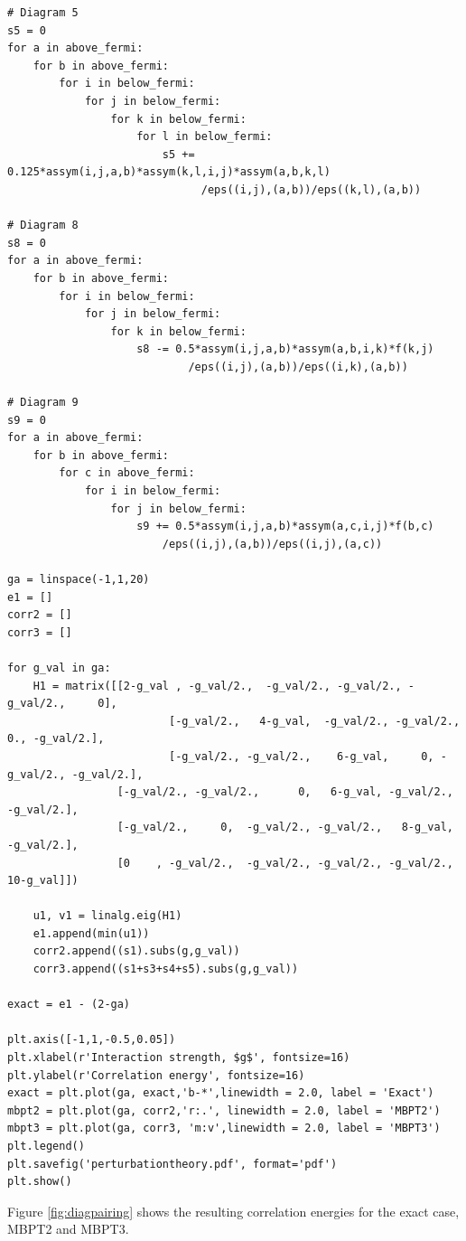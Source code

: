 \begin{lstlisting}
# Diagram 5
s5 = 0
for a in above_fermi:
    for b in above_fermi:
        for i in below_fermi:
            for j in below_fermi:
                for k in below_fermi:
                    for l in below_fermi:
                        s5 += 0.125*assym(i,j,a,b)*assym(k,l,i,j)*assym(a,b,k,l)
                              /eps((i,j),(a,b))/eps((k,l),(a,b))

# Diagram 8 
s8 = 0
for a in above_fermi:
    for b in above_fermi:
        for i in below_fermi:
            for j in below_fermi:
                for k in below_fermi:
                    s8 -= 0.5*assym(i,j,a,b)*assym(a,b,i,k)*f(k,j)
                            /eps((i,j),(a,b))/eps((i,k),(a,b))

# Diagram 9 
s9 = 0
for a in above_fermi:
    for b in above_fermi:
        for c in above_fermi:
            for i in below_fermi:
                for j in below_fermi:
                    s9 += 0.5*assym(i,j,a,b)*assym(a,c,i,j)*f(b,c)
                        /eps((i,j),(a,b))/eps((i,j),(a,c))

ga = linspace(-1,1,20)
e1 = []
corr2 = []
corr3 = []

for g_val in ga:
    H1 = matrix([[2-g_val , -g_val/2.,  -g_val/2., -g_val/2., -g_val/2.,     0],
                         [-g_val/2.,   4-g_val,  -g_val/2., -g_val/2.,    0., -g_val/2.],
                         [-g_val/2., -g_val/2.,    6-g_val,     0, -g_val/2., -g_val/2.],
                 [-g_val/2., -g_val/2.,      0,   6-g_val, -g_val/2., -g_val/2.],
                 [-g_val/2.,     0,  -g_val/2., -g_val/2.,   8-g_val, -g_val/2.],
                 [0    , -g_val/2.,  -g_val/2., -g_val/2., -g_val/2.,  10-g_val]])

    u1, v1 = linalg.eig(H1)
    e1.append(min(u1))
    corr2.append((s1).subs(g,g_val))
    corr3.append((s1+s3+s4+s5).subs(g,g_val))

exact = e1 - (2-ga)

plt.axis([-1,1,-0.5,0.05])
plt.xlabel(r'Interaction strength, $g$', fontsize=16)
plt.ylabel(r'Correlation energy', fontsize=16)
exact = plt.plot(ga, exact,'b-*',linewidth = 2.0, label = 'Exact')
mbpt2 = plt.plot(ga, corr2,'r:.', linewidth = 2.0, label = 'MBPT2')
mbpt3 = plt.plot(ga, corr3, 'm:v',linewidth = 2.0, label = 'MBPT3')
plt.legend()
plt.savefig('perturbationtheory.pdf', format='pdf')
plt.show()
\end{lstlisting}
Figure \ref{fig:diagpairing} shows the resulting correlation energies for the exact case, MBPT2 and MBPT3.

